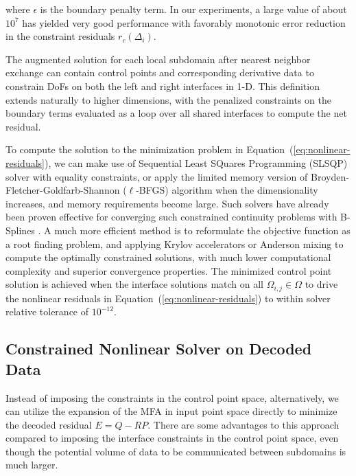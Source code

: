 \documentclass[conference]{IEEEtran}
\newcommand{\eqt}[1]{Equation~(\ref{#1})}
\begin{document}
where $\epsilon$ is the boundary penalty term. In our experiments, a large value of about $10^{7}$ has yielded very good performance with favorably monotonic error reduction in the constraint residuals $r_c(\Delta_{i})$.

The augmented solution for each local subdomain after nearest neighbor exchange can contain control points and corresponding derivative data to constrain DoFs on both the left and right interfaces in 1-D. This definition extends naturally to higher dimensions, with the penalized constraints on the boundary terms evaluated as a loop over all shared interfaces to compute the net residual. 

To compute the solution to the minimization problem in \eqt{eq:nonlinear-residuals}, we can make use of Sequential Least SQuares Programming (SLSQP) solver with equality constraints, or apply the limited memory version of  Broyden-Fletcher-Goldfarb-Shannon ($\ell$-BFGS) algorithm when the dimensionality increases, and memory requirements become large. Such solvers have already been proven effective for converging such constrained continuity problems with B-Splines \cite{zheng-bo-bspline-bfgs}. A much more efficient method is to reformulate the objective function as a root finding problem, and applying Krylov accelerators or Anderson mixing to compute the optimally constrained solutions, with much lower computational complexity and superior convergence properties. The minimized control point solution is achieved when the interface solutions match on all $\Omega_{i,j} \in \Omega$ to drive the nonlinear residuals in \eqt{eq:nonlinear-residuals} to within solver relative tolerance of $10^{-12}$.


\subsection{Constrained Nonlinear Solver on Decoded Data}

Instead of imposing the constraints in the control point space, alternatively, we can utilize the expansion of the MFA in input point space directly to minimize the decoded residual $E= Q - R P$. There are some advantages to this approach compared to imposing the interface constraints in the control point space, even though the potential volume of data to be communicated between subdomains is much larger.
\end{document}
